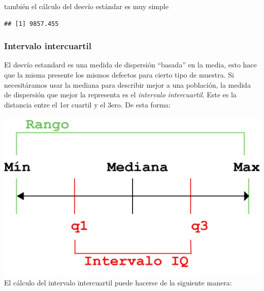 \documentclass[
]{book}
\newenvironment{Shaded}{\begin{snugshade}}{\end{snugshade}}
\newcommand{\FunctionTok}[1]{\textcolor[rgb]{0.00,0.00,0.00}{#1}}
\newcommand{\NormalTok}[1]{#1}
\newcommand{\SpecialCharTok}[1]{\textcolor[rgb]{0.00,0.00,0.00}{#1}}
\begin{document}
también el cálculo del desvío estándar es muy simple

\begin{Shaded}
\end{Shaded}

\begin{verbatim}
## [1] 9857.455
\end{verbatim}

\hypertarget{intervalo-intercuartil}{%
\subsubsection{Intervalo intercuartil}\label{intervalo-intercuartil}}

El desvío estandard es una medida de dispersión ``basada'' en la media, esto hace que la misma presente los mismos defectos para cierto tipo de muestra. Si necesitáramos usar la mediana para describir mejor a una población, la medida de dispersión que mejor la representa es el \emph{intervalo intercuartil}. Este es la distancia entre el 1er cuartil y el 3ero. De esta forma:

\includegraphics[width=18.36in]{img/IQR}
El cálculo del intervalo intercuartil puede hacerse de la siguiente manera:

\begin{Shaded}
\end{Shaded}
\end{document}
